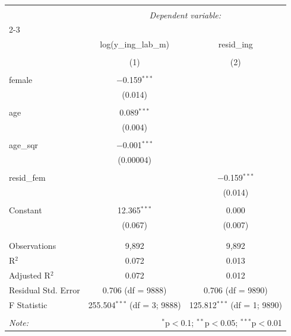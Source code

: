 
\begin{table}[!htbp] \centering 
  \caption{} 
  \label{} 
\begin{tabular}{@{\extracolsep{5pt}}lcc} 
\\[-1.8ex]\hline 
\hline \\[-1.8ex] 
 & \multicolumn{2}{c}{\textit{Dependent variable:}} \\ 
\cline{2-3} 
\\[-1.8ex] & log(y\_ing\_lab\_m) & resid\_ing \\ 
\\[-1.8ex] & (1) & (2)\\ 
\hline \\[-1.8ex] 
 female & $-$0.159$^{***}$ &  \\ 
  & (0.014) &  \\ 
  & & \\ 
 age & 0.089$^{***}$ &  \\ 
  & (0.004) &  \\ 
  & & \\ 
 age\_sqr & $-$0.001$^{***}$ &  \\ 
  & (0.00004) &  \\ 
  & & \\ 
 resid\_fem &  & $-$0.159$^{***}$ \\ 
  &  & (0.014) \\ 
  & & \\ 
 Constant & 12.365$^{***}$ & 0.000 \\ 
  & (0.067) & (0.007) \\ 
  & & \\ 
\hline \\[-1.8ex] 
Observations & 9,892 & 9,892 \\ 
R$^{2}$ & 0.072 & 0.013 \\ 
Adjusted R$^{2}$ & 0.072 & 0.012 \\ 
Residual Std. Error & 0.706 (df = 9888) & 0.706 (df = 9890) \\ 
F Statistic & 255.504$^{***}$ (df = 3; 9888) & 125.812$^{***}$ (df = 1; 9890) \\ 
\hline 
\hline \\[-1.8ex] 
\textit{Note:}  & \multicolumn{2}{r}{$^{*}$p$<$0.1; $^{**}$p$<$0.05; $^{***}$p$<$0.01} \\ 
\end{tabular} 
\end{table} 
